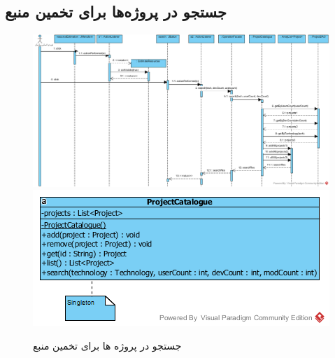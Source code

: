 \begin{landscape}
\newpage
\section{جستجو در پروژه‌ها برای تخمین منبع}
\begin{figure}[H]
	\centering
	\includegraphics[scale=0.6]{img/sequence-design/SearchInProjects}
	\includegraphics[scale=0.7]{img/sequence-design/SearchInProjectsC}
	\caption{جستجو در پروژه ها برای تخمین منبع}
\end{figure}


\end{landscape}
